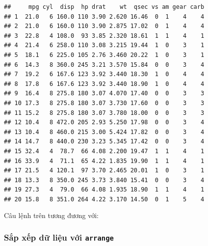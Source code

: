 \documentclass[]{krantz}
\makeatletter
\newenvironment{Shaded}{\begin{snugshade}}{\end{snugshade}}
\newcommand{\DecValTok}[1]{\textcolor[rgb]{0.06,0.06,0.06}{#1}}
\newcommand{\KeywordTok}[1]{\textcolor[rgb]{0.27,0.27,0.27}{\textbf{#1}}}
\newcommand{\NormalTok}[1]{#1}
\newcommand{\OperatorTok}[1]{\textcolor[rgb]{0.43,0.43,0.43}{\textbf{#1}}}
\newcommand{\StringTok}[1]{\textcolor[rgb]{0.5,0.5,0.5}{#1}}
\newenvironment{kframe}{%
\medskip{}
\setlength{\fboxsep}{.8em}
 \def\at@end@of@kframe{}%
 \ifinner\ifhmode%
  \def\at@end@of@kframe{\end{minipage}}%
  \begin{minipage}{\columnwidth}%
 \fi\fi%
 \def\FrameCommand##1{\hskip\@totalleftmargin \hskip-\fboxsep
 \colorbox{shadecolor}{##1}\hskip-\fboxsep
     \hskip-\linewidth \hskip-\@totalleftmargin \hskip\columnwidth}%
 \MakeFramed {\advance\hsize-\width
   \@totalleftmargin\z@ \linewidth\hsize
   \@setminipage}}%
 {\par\unskip\endMakeFramed%
 \at@end@of@kframe}
\renewenvironment{Shaded}{\begin{kframe}}{\end{kframe}}
\renewenvironment{Shaded}{\begin{snugshade}}{\end{snugshade}}
\renewcommand{\DecValTok}[1]{\textcolor[rgb]{0.00,0.00,0.81}{#1}}
\renewcommand{\KeywordTok}[1]{\textcolor[rgb]{0.13,0.29,0.53}{\textbf{#1}}}
\renewcommand{\NormalTok}[1]{#1}
\renewcommand{\OperatorTok}[1]{\textcolor[rgb]{0.81,0.36,0.00}{\textbf{#1}}}
\renewcommand{\StringTok}[1]{\textcolor[rgb]{0.31,0.60,0.02}{#1}}
\theoremstyle{definition}
\theoremstyle{definition}
\theoremstyle{definition}
\theoremstyle{remark}
\makeatother
\begin{document}
\begin{Shaded}
\end{Shaded}

\begin{verbatim}
##     mpg cyl  disp  hp drat    wt  qsec vs am gear carb
## 1  21.0   6 160.0 110 3.90 2.620 16.46  0  1    4    4
## 2  21.0   6 160.0 110 3.90 2.875 17.02  0  1    4    4
## 3  22.8   4 108.0  93 3.85 2.320 18.61  1  1    4    1
## 4  21.4   6 258.0 110 3.08 3.215 19.44  1  0    3    1
## 5  18.1   6 225.0 105 2.76 3.460 20.22  1  0    3    1
## 6  14.3   8 360.0 245 3.21 3.570 15.84  0  0    3    4
## 7  19.2   6 167.6 123 3.92 3.440 18.30  1  0    4    4
## 8  17.8   6 167.6 123 3.92 3.440 18.90  1  0    4    4
## 9  16.4   8 275.8 180 3.07 4.070 17.40  0  0    3    3
## 10 17.3   8 275.8 180 3.07 3.730 17.60  0  0    3    3
## 11 15.2   8 275.8 180 3.07 3.780 18.00  0  0    3    3
## 12 10.4   8 472.0 205 2.93 5.250 17.98  0  0    3    4
## 13 10.4   8 460.0 215 3.00 5.424 17.82  0  0    3    4
## 14 14.7   8 440.0 230 3.23 5.345 17.42  0  0    3    4
## 15 32.4   4  78.7  66 4.08 2.200 19.47  1  1    4    1
## 16 33.9   4  71.1  65 4.22 1.835 19.90  1  1    4    1
## 17 21.5   4 120.1  97 3.70 2.465 20.01  1  0    3    1
## 18 13.3   8 350.0 245 3.73 3.840 15.41  0  0    3    4
## 19 27.3   4  79.0  66 4.08 1.935 18.90  1  1    4    1
## 20 15.8   8 351.0 264 4.22 3.170 14.50  0  1    5    4
\end{verbatim}

Câu lệnh trên tương đương với:

\begin{Shaded}
\end{Shaded}

\hypertarget{sp-xp-d-liu-vi-arrange}{%
\subsubsection{\texorpdfstring{Sắp xếp dữ liệu với
\texttt{arrange}}{Sắp xếp dữ liệu với arrange}}\label{sp-xp-d-liu-vi-arrange}}
\end{document}
